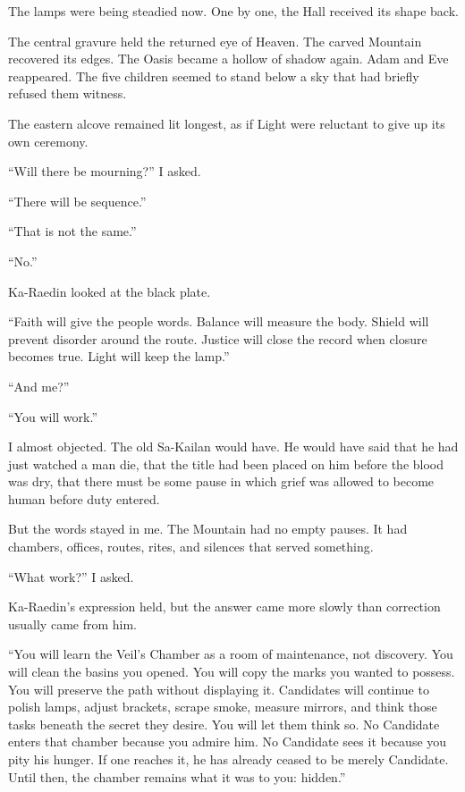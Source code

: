 The lamps were being steadied now.
One by one, the Hall received its shape back.\par
The central gravure held the returned eye of Heaven.
The carved Mountain recovered its edges.
The Oasis became a hollow of shadow again.
Adam and Eve reappeared.
The five children seemed to stand below a sky that had briefly refused them witness.\par
The eastern alcove remained lit longest, as if Light were reluctant to give up its own ceremony.\par
``Will there be mourning?'' I asked.\par
``There will be sequence.''\par
``That is not the same.''\par
``No.''\par
Ka-Raedin looked at the black plate.\par
``Faith will give the people words.
Balance will measure the body.
Shield will prevent disorder around the route.
Justice will close the record when closure becomes true.
Light will keep the lamp.''\par
``And me?''\par
``You will work.''\par
I almost objected.
The old Sa-Kailan would have.
He would have said that he had just watched a man die, that the title had been placed on him before the blood was dry, that there must be some pause in which grief was allowed to become human before duty entered.\par
But the words stayed in me.
The Mountain had no empty pauses.
It had chambers, offices, routes, rites, and silences that served something.\par
``What work?'' I asked.\par
Ka-Raedin's expression held, but the answer came more slowly than correction usually came from him.\par
``You will learn the Veil's Chamber as a room of maintenance, not discovery.
You will clean the basins you opened.
You will copy the marks you wanted to possess.
You will preserve the path without displaying it.
Candidates will continue to polish lamps, adjust brackets, scrape smoke, measure mirrors, and think those tasks beneath the secret they desire.
You will let them think so.
No Candidate enters that chamber because you admire him.
No Candidate sees it because you pity his hunger.
If one reaches it, he has already ceased to be merely Candidate.
Until then, the chamber remains what it was to you: hidden.''\par

